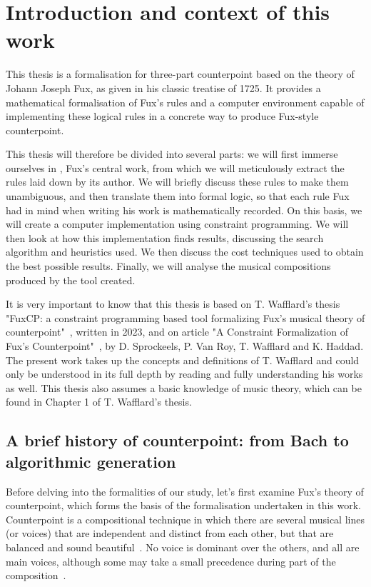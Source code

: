 \chapter{Introduction and context of this work}
This thesis is a formalisation for three-part counterpoint based on the theory of Johann Joseph Fux, as given in his classic treatise of 1725. It provides a mathematical formalisation of Fux's rules and a computer environment capable of implementing these logical rules in a concrete way to produce Fux-style counterpoint.


This thesis will therefore be divided into several parts: we will first immerse ourselves in \gap, Fux's central work, from which we will meticulously extract the rules laid down by its author. We will briefly discuss these rules to make them unambiguous, and then translate them into formal logic, so that each rule Fux had in mind when writing his work is mathematically recorded. On this basis, we will create a computer implementation using constraint programming. We will then look at how this implementation finds results, discussing the search algorithm and heuristics used. We then discuss the cost techniques used to obtain the best possible results. Finally, we will analyse the musical compositions produced by the tool created.

It is very important to know that this thesis is based on T. Wafflard's thesis "FuxCP: a constraint programming based tool formalizing Fux's musical theory of counterpoint"~\cite{wafflard2023}, written in 2023, and on article "A Constraint Formalization of Fux's Counterpoint"~\cite{sprockeels2023constraint}, by D. Sprockeels, P. Van Roy, T. Wafflard and K. Haddad. The present work takes up the concepts and definitions of T. Wafflard and could only be understood in its full depth by reading and fully understanding his works as well. This thesis also assumes a basic knowledge of music theory, which can be found in Chapter 1 of T. Wafflard's thesis. %



\section{A brief history of counterpoint: from Bach to algorithmic generation}
Before delving into the formalities of our study, let's first examine Fux's theory of counterpoint, which forms the basis of the formalisation undertaken in this work. Counterpoint is a compositional technique in which there are several musical lines (or voices) that are independent and distinct from each other, but that are balanced and sound beautiful~\cite{CpSachs}. No voice is dominant over the others, and all are main voices, although some may take a small precedence during part of the composition~\cite{hess2016}.


